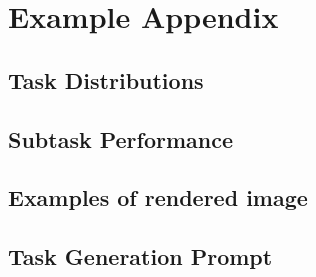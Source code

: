 \newpage
\clearpage
\onecolumn
\section{Example Appendix}
\label{sec:appendix}

% 

\subsection{Task Distributions}


\newpage
\clearpage
\subsection{Subtask Performance}
\label{appendix:subtask_perf}


\newpage
\clearpage

\subsection{Examples of rendered image}
\label{appendix:rendered_images}


\newpage
\clearpage

\subsection{Task Generation Prompt}
\label{appendix:task_prompt}


